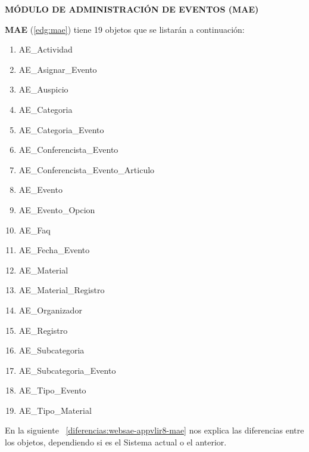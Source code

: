 \begin{indentar}
\textbf{M\'ODULO DE ADMINISTRACI\'ON DE EVENTOS (MAE)}

\textbf{MAE} (\ref{edg:mae}) tiene 19 objetos que se listar\'an a continuaci\'on:

\begin{enumerate}
\item AE\_Actividad
\item AE\_Asignar\_Evento
\item AE\_Auspicio
\item AE\_Categoria
\item AE\_Categoria\_Evento
\item AE\_Conferencista\_Evento
\item AE\_Conferencista\_Evento\_Articulo
\item AE\_Evento
\item AE\_Evento\_Opcion
\item AE\_Faq
\item AE\_Fecha\_Evento
\item AE\_Material
\item AE\_Material\_Registro
\item AE\_Organizador
\item AE\_Registro
\item AE\_Subcategoria
\item AE\_Subcategoria\_Evento
\item AE\_Tipo\_Evento
\item AE\_Tipo\_Material
\end{enumerate}

En la siguiente ~\ref{diferencias:websae-appvlir8-mae} nos explica las diferencias entre los objetos, dependiendo si es el Sistema actual o el anterior.


\end{indentar}
